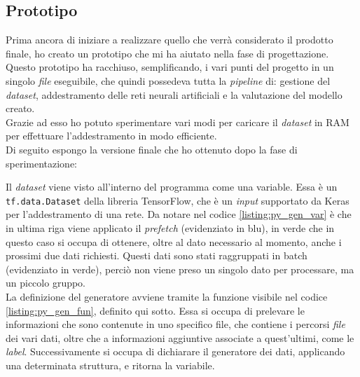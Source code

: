 \subsection{Prototipo}\noindent
Prima ancora di iniziare a realizzare quello che verrà considerato il prodotto finale, ho creato un prototipo che mi ha aiutato nella fase di progettazione.\\
Questo prototipo ha racchiuso, semplificando, i vari punti del progetto in un singolo \textit{file} eseguibile, che quindi possedeva tutta la \textit{pipeline} di: gestione del \textit{dataset}, addestramento delle reti neurali artificiali e la valutazione del modello creato.\\
Grazie ad esso ho potuto sperimentare vari modi per caricare il \textit{dataset} in RAM per effettuare l'addestramento in modo efficiente.\\
Di seguito espongo la versione finale che ho ottenuto dopo la fase di sperimentazione:
\noindent
Il \textit{dataset} viene visto all'interno del programma come una variable. Essa è un \texttt{tf.data.Dataset} della libreria TensorFlow, che è un \textit{input} supportato da Keras per l'addestramento di una rete.
Da notare nel codice \ref{listing:py_gen_var} è che in ultima riga viene applicato il \textit{prefetch} (evidenziato in blu), in verde che in questo caso si occupa di ottenere, oltre al dato necessario al momento, anche i prossimi due dati richiesti. Questi dati sono stati raggruppati in \gls{batch} (evidenziato in verde), perciò non viene preso un singolo dato per processare, ma un piccolo gruppo.\\
La definizione del generatore avviene tramite la funzione visibile nel codice \ref{listing:py_gen_fun}, definito qui sotto.
Essa si occupa di prelevare le informazioni che sono contenute in uno specifico file, che contiene i percorsi \textit{file} dei vari dati, oltre che a informazioni aggiuntive associate a quest'ultimi, come le \textit{label}.
Successivamente si occupa di dichiarare il generatore dei dati, applicando una determinata struttura, e ritorna la variabile.
